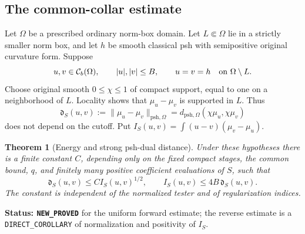 \documentclass[11pt,a4paper]{article}
\numberwithin{equation}{section}
\newtheorem{theorem}{Theorem}[section]
\theoremstyle{definition}
\theoremstyle{remark}
\begin{document}
\subsection{The common-collar estimate}

Let $\Omega$ be a prescribed ordinary norm-box domain. Let
$L\Subset\Omega$ lie in a strictly smaller norm box, and let $h$
be smooth classical psh with semipositive original curvature form.
Suppose
\[
 u,v\in\mathcal C_b(\Omega),\qquad |u|,|v|\leq B,\qquad
 u=v=h\quad\hbox{on }\Omega\setminus L.
\]
Choose original smooth $0\leq\chi\leq1$ of compact support,
equal to one on a neighborhood of $L$. Locality shows that
$\mu_u-\mu_v$ is supported in $L$. Thus
\[
 \mathfrak d_S(u,v)
   :=\|\mu_u-\mu_v\|_{\mathrm{psh},\Omega}
    =d_{\mathrm{psh},\Omega}(\chi\mu_u,\chi\mu_v)
\]
does not depend on the cutoff. Put
$I_S(u,v)=\int(u-v)(\mu_v-\mu_u)$.

\begin{theorem}[Energy and strong psh-dual distance]
\label{thm:r3-relative-energy-dual}
Under these hypotheses there is a finite constant $C$, depending
only on the fixed compact stages, the common bound, $q$, and
finitely many positive coefficient evaluations of $S$, such that
\begin{equation}
 \mathfrak d_S(u,v)\leq C I_S(u,v)^{1/2},
 \qquad I_S(u,v)\leq4B\,\mathfrak d_S(u,v).
 \label{eq:r3-relative-energy-dual}
\end{equation}
The constant is independent of the normalized tester and of
regularization indices.
\end{theorem}

\noindent\textbf{Status: \texttt{NEW\_PROVED}} for the uniform
forward estimate; the reverse estimate is a
\texttt{DIRECT\_COROLLARY} of normalization and positivity of $I_S$.
\end{document}
